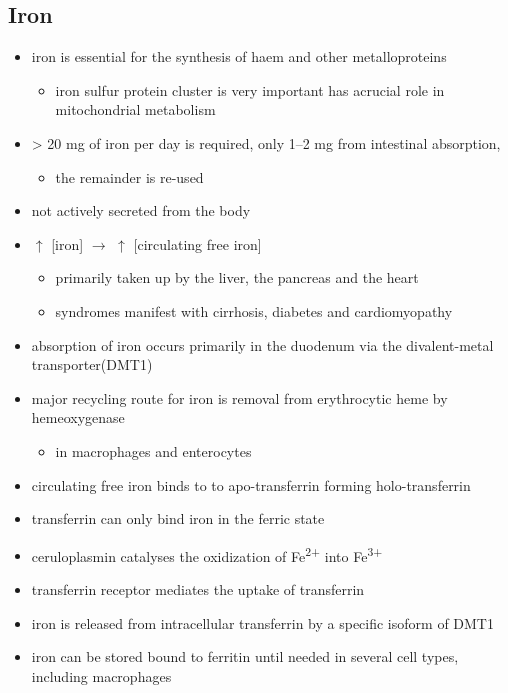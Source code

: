 \documentclass{scrartcl}
\begin{document}
\subsection{Iron}
\label{sec:orge98c643}
\begin{itemize}
\item iron is essential for the synthesis of haem and other
metalloproteins
\begin{itemize}
\item iron sulfur protein cluster is very important has acrucial role in
mitochondrial metabolism
\end{itemize}
\item \textgreater{} 20 mg of iron per day is required, only 1–2 mg from intestinal absorption,
\begin{itemize}
\item the remainder is re-used
\end{itemize}
\item not actively secreted from the body
\item \(\uparrow\) [iron] \(\to\) \(\uparrow\) [circulating free iron]
\begin{itemize}
\item primarily taken up by the liver, the pancreas and the heart
\item syndromes manifest with cirrhosis, diabetes and cardiomyopathy
\end{itemize}
\item absorption of iron occurs primarily in the duodenum via the
divalent-metal transporter(DMT1)
\item major recycling route for iron is removal from erythrocytic heme by
hemeoxygenase
\begin{itemize}
\item in macrophages and enterocytes
\end{itemize}
\item circulating free iron binds to to apo-transferrin forming holo-transferrin
\item transferrin can only bind iron in the ferric state
\item ceruloplasmin catalyses the oxidization of Fe\textsuperscript{2+} into Fe\textsuperscript{3+}
\item transferrin receptor mediates the uptake of transferrin
\item iron is released from intracellular transferrin by a specific isoform of DMT1
\item iron can be stored bound to ferritin until needed in several cell
types, including macrophages
\end{itemize}
\end{document}
